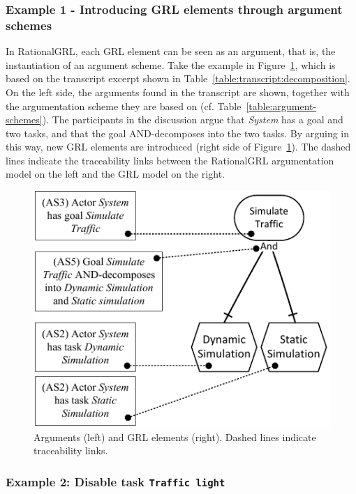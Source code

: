 \subsubsection{Example 1 - Introducing GRL elements through argument schemes}
In RationalGRL, each GRL element can be seen as an argument, that is, the instantiation of an argument scheme. Take the example in Figure~\ref{fig:example_AS}, which is based on the transcript excerpt shown in Table~\ref{table:transcript:decomposition}. On the left side, the arguments found in the transcript are shown, together with the argumentation scheme they are based on (cf. Table~\ref{table:argument-schemes}). The participants in the discussion argue that \emph{System} has a goal and two tasks, and that the goal AND-decomposes into the two tasks. By arguing in this way, new GRL elements are introduced (right side of Figure~\ref{fig:example_AS}). The dashed lines indicate the traceability links between the RationalGRL argumentation model on the left and the GRL model on the right. 

\begin{figure}[h]
\centering
\includegraphics[width=\columnwidth]{img/fig_example_AS.pdf}
\caption{Arguments (left) and GRL elements (right). Dashed lines indicate traceability links.}
\label{fig:example_AS}
\end{figure}

\subsubsection{Example 2: Disable task \texttt{Traffic light}}

